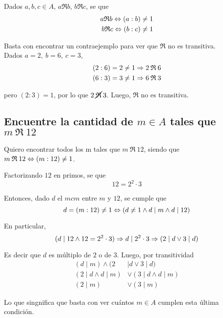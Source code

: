 \documentclass[a4paper,spanish]{article}
\begin{document}
\begin{itemize}
    Dados $a,b,c \in A$, $a\mathfrak{R}b$, $b\mathfrak{R}c$, se que
    \begin{align*}
      a\mathfrak{R}b \Leftrightarrow (a:b) \neq 1 \\
      b\mathfrak{R}c \Leftrightarrow (b:c) \neq 1
    \end{align*}

    Basta con encontrar un contraejemplo para ver que $\mathfrak{R}$ 
    no es transitiva.\\
    Dados $a=2,\> b=6,\> c=3$,
    \begin{align*}
      (2:6) = 2 \neq 1 \Rightarrow 2\>\mathfrak{R}\>6 \\
      (6:3) = 3 \neq 1 \Rightarrow 6\>\mathfrak{R}\>3 \\
    \end{align*}

    pero $(2:3) = 1$, por lo que $2\> \cancel{\mathfrak{R}}\> 3$.
    Luego, $\mathfrak{R}$ no es transitiva.

  \end{itemize}

  \newpage
  \subsection{%
  Encuentre la cantidad de $m \in A$ tales que $m\> \mathfrak{R}\> 12$%
  }

    Quiero encontrar todos los m tales que $m\>\mathfrak{R}\>12$, siendo que  
    $m\>\mathfrak{R}\>12 \Leftrightarrow (m:12) \neq 1$.

    Factorizando $12$ en primos, se que 
    \[
      12 = 2^2 \cdot 3
    \]

    Entonces, dado $d$ el $mcm$ entre $m$ y $12$, se cumple que
    \[
      d = (m:12) \neq 1
      \Leftrightarrow
      (d \neq 1 \land d \mid m \land d \mid 12)
    \] 

    En particular, 
    \[
      (d \mid 12 \land 12=2^2 \cdot 3)
      \Rightarrow d \mid 2^2 \cdot 3 
      \Rightarrow (2 \mid d \lor 3 \mid d)
    \]

    Es decir que $d$ es múltiplo de $2$ o de $3$. Luego, por transitividad
    \begin{align*}
      (d \mid m) \land (2 &\mid d \lor 3 \mid d) \\
      (2\mid d \land d \mid m) &\lor (3 \mid d \land d \mid m) \\
      (2 \mid m)               &\lor (3 \mid m)
    \end{align*}

    Lo que singnifica que basta con ver cuántos $m \in A$ cumplen esta 
    última condición.
\end{document}
